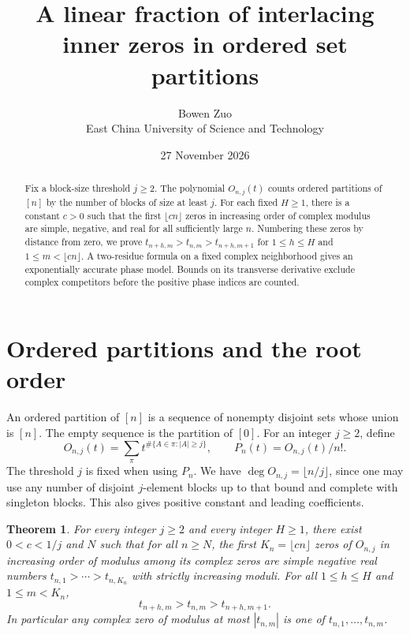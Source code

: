 \documentclass[11pt]{article}
\title{A linear fraction of interlacing inner zeros in ordered set partitions}
\author{Bowen Zuo\\[2pt]\small East China University of Science and Technology}
\date{27 November 2026}
\newtheorem{theorem}{Theorem}
\begin{document}
\maketitle

\begin{abstract}
Fix a block-size threshold $j\ge2$. The polynomial $O_{n,j}(t)$ counts
ordered partitions of $[n]$ by the number of blocks of size at least $j$.
For each fixed $H\ge1$, there is a constant $c>0$ such that the first
$\lfloor cn\rfloor$ zeros in increasing order of complex modulus are
simple, negative, and real for all sufficiently large $n$. Numbering
these zeros by distance from zero, we prove
$t_{n+h,m}>t_{n,m}>t_{n+h,m+1}$ for $1\le h\le H$ and
$1\le m<\lfloor cn\rfloor$. A two-residue formula on a fixed complex
neighborhood gives an exponentially accurate phase model. Bounds on
its transverse derivative exclude complex competitors before the
positive phase indices are counted.
\end{abstract}

\section{Ordered partitions and the root order}

An ordered partition of $[n]$ is a sequence of nonempty disjoint sets
whose union is $[n]$. The empty sequence is the partition of $[0]$.
For an integer $j\ge2$, define
\[
 O_{n,j}(t)=\sum_{\pi}t^{\#\{A\in\pi: |A|\ge j\}},
 \qquad P_n(t)=O_{n,j}(t)/n!.
\]
The threshold $j$ is fixed when using $P_n$. We have
$\deg O_{n,j}=\lfloor n/j\rfloor$, since one may use any number of disjoint
$j$-element blocks up to that bound and complete with singleton blocks.
This also gives positive constant and leading coefficients.

\begin{theorem}\label{thm:main}
For every integer $j\ge2$ and every integer $H\ge1$, there exist
$0<c<1/j$ and $N$ such that for all $n\ge N$, the first
$K_n=\lfloor cn\rfloor$ zeros of $O_{n,j}$ in increasing order of
modulus among its complex zeros are simple negative real numbers
$t_{n,1}>\cdots>t_{n,K_n}$ with strictly increasing moduli.
For all $1\le h\le H$ and $1\le m<K_n$,
\[
 t_{n+h,m}>t_{n,m}>t_{n+h,m+1}.
\]
In particular any complex zero of modulus at most $|t_{n,m}|$ is one
of $t_{n,1},\ldots,t_{n,m}$.
\end{theorem}
\end{document}
